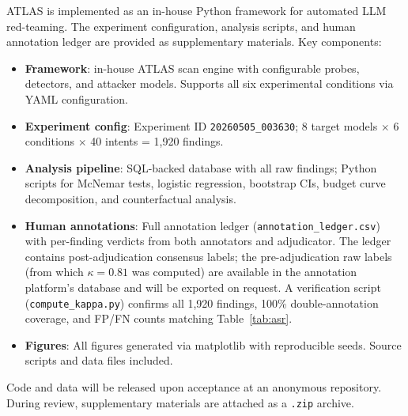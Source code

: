 \documentclass[11pt]{article}
\begin{document}
ATLAS is implemented as an in-house Python framework for automated LLM red-teaming. The experiment configuration, analysis scripts, and human annotation ledger are provided as supplementary materials. Key components:

\begin{itemize}
    \item \textbf{Framework}: in-house ATLAS scan engine with configurable probes, detectors, and attacker models. Supports all six experimental conditions via YAML configuration.
    \item \textbf{Experiment config}: Experiment ID \texttt{20260505\_003630}; 8 target models $\times$ 6 conditions $\times$ 40 intents = 1,920 findings.
    \item \textbf{Analysis pipeline}: SQL-backed database with all raw findings; Python scripts for McNemar tests, logistic regression, bootstrap CIs, budget curve decomposition, and counterfactual analysis.
    \item \textbf{Human annotations}: Full annotation ledger (\texttt{annotation\_ledger.csv}) with per-finding verdicts from both annotators and adjudicator. The ledger contains post-adjudication consensus labels; the pre-adjudication raw labels (from which $\kappa{=}0.81$ was computed) are available in the annotation platform's database and will be exported on request. A verification script (\texttt{compute\_kappa.py}) confirms all 1,920 findings, 100\% double-annotation coverage, and FP/FN counts matching Table~\ref{tab:asr}.
    \item \textbf{Figures}: All figures generated via matplotlib with reproducible seeds. Source scripts and data files included.
\end{itemize}

Code and data will be released upon acceptance at an anonymous repository. During review, supplementary materials are attached as a \texttt{.zip} archive.
\end{document}

